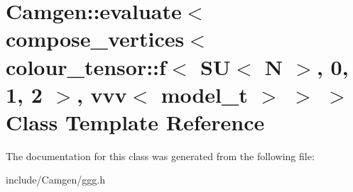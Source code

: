 \hypertarget{a00169}{\section{Camgen\-:\-:evaluate$<$ compose\-\_\-vertices$<$ colour\-\_\-tensor\-:\-:f$<$ S\-U$<$ N $>$, 0, 1, 2 $>$, vvv$<$ model\-\_\-t $>$ $>$ $>$ Class Template Reference}
\label{a00169}
}


The documentation for this class was generated from the following file\-:\begin{DoxyCompactItemize}
\item 
include/\-Camgen/ggg.\-h\end{DoxyCompactItemize}
